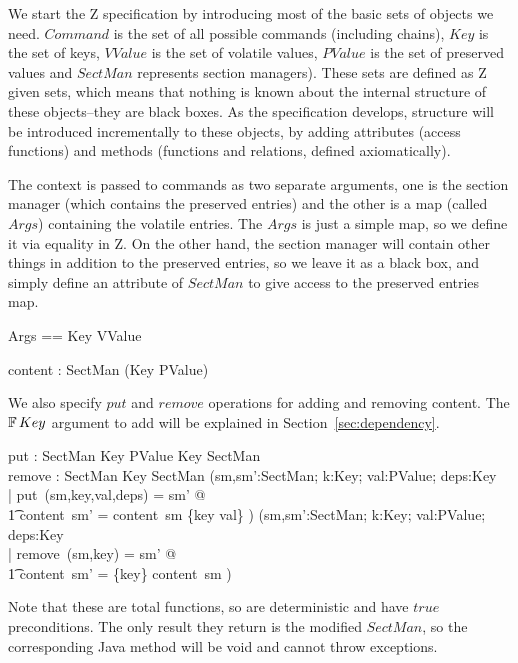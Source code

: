 \documentclass{llncs} %
\begin{document}
We start the Z specification by introducing most of the basic
sets of objects we need.  $Command$ is the set of all possible
commands (including chains), $Key$ is the set of keys, $VValue$ is the set
of volatile values, $PValue$ is the set of preserved values and $SectMan$
represents section managers).  These sets are defined as Z given sets, which
means that nothing is known about the internal structure of these
objects--they are black boxes.  As the specification develops,
structure will be introduced incrementally to these objects, by adding
attributes (access functions) and methods (functions and relations, defined
axiomatically).
\begin{zed}
\end{zed}

The context is passed to commands as two separate arguments, one
is the section manager (which contains the preserved entries) and the other
is a map (called $Args$) containing the volatile entries.  The $Args$
is just a simple map, so we define it via equality in Z.  On the other
hand, the section manager will contain other things in addition to the
preserved entries, so we leave it as a black box, and simply define an
attribute of $SectMan$ to give access to the preserved entries map.
\begin{zed}
  Args == Key \ffun VValue
\end{zed}

\begin{axdef}
  content : SectMan \fun (Key \ffun PValue)
\end{axdef}

We also specify $put$ and $remove$ operations for adding and removing
content.  The $\finset Key$ argument to add will be explained in
Section~\ref{sec:dependency}.
\begin{axdef}
  put : SectMan \cross Key \cross PValue \cross \finset Key \fun SectMan\\
  remove : SectMan \cross Key \fun SectMan
\where
  (\forall sm,sm':SectMan; k:Key; val:PValue; deps:\finset Key \\
  | put~(sm,key,val,deps) = sm' @ \\
  \t1 content~sm' = content~sm \oplus \{key \mapsto val\} ) 
\also
  (\forall sm,sm':SectMan; k:Key; val:PValue; deps:\finset Key \\
  | remove~(sm,key) = sm' @ \\
  \t1 content~sm' = \{key\} \ndres content~sm ) \\
\end{axdef}
Note that these are total functions, so are deterministic and
have $true$ preconditions.  The only result they return is the
modified $SectMan$, so the corresponding Java method will be void
and cannot throw exceptions.
\end{document}
